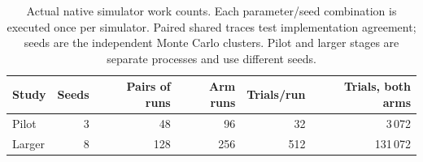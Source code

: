 \begin{table}[tbp]\centering\small
\begin{tabular}{lrrrrr}\toprule Study & Seeds & Pairs of runs & Arm runs & Trials/run & Trials, both arms\\\midrule
Pilot & 3 & 48 & 96 & 32 & 3\,072\\
Larger & 8 & 128 & 256 & 512 & 131\,072\\
\bottomrule\end{tabular}
\caption{Actual native simulator work counts. Each parameter/seed combination is executed once per simulator. Paired shared traces test implementation agreement; seeds are the independent Monte Carlo clusters. Pilot and larger stages are separate processes and use different seeds.}\label{tab:validationcrosssim}\end{table}
